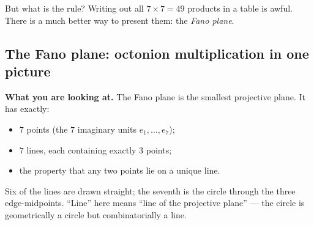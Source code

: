 \documentclass[11pt]{article}
\begin{document}
But what is the rule? Writing out all $7 \times 7 = 49$ products in
a table is awful. There is a much better way to present them: the
\emph{Fano plane}.

\subsection*{The Fano plane: octonion multiplication in one picture}

\begin{center}
\end{center}

\textbf{What you are looking at.} The Fano plane is the smallest
projective plane. It has exactly:
\begin{itemize}[leftmargin=*, itemsep=2pt]
  \item $7$ points (the $7$ imaginary units $e_1, \dots, e_7$);
  \item $7$ lines, each containing exactly $3$ points;
  \item the property that any two points lie on a unique line.
\end{itemize}
Six of the lines are drawn straight; the seventh is the circle
through the three edge-midpoints. ``Line'' here means
``line of the projective plane'' --- the circle is geometrically a
circle but combinatorially a line.
\end{document}
